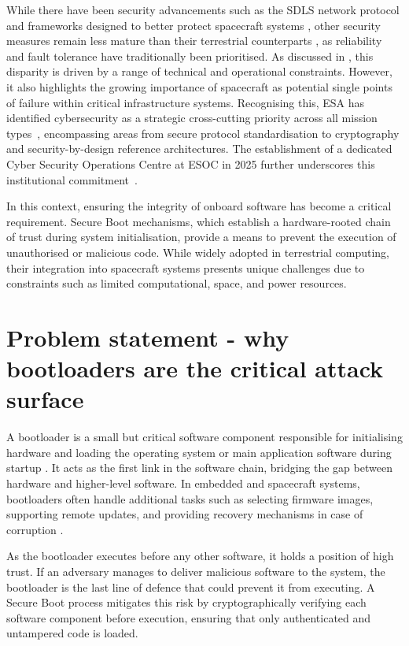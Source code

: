 While there have been security advancements such as the SDLS network protocol \cite{SDLS_Protocol_2010} and frameworks designed to better protect spacecraft systems \cite{Moutafis_2025, ESA_SPACE_SHIELD_2023}, other security measures remain less mature than their terrestrial counterparts \cite{space_odyssey_2023, space_vacuum_cyber, call_to_action}, as reliability and fault tolerance have traditionally been prioritised. As discussed in \cite{space_vacuum_cyber}, this disparity is driven by a range of technical and operational constraints. However, it also highlights the growing importance of spacecraft as potential single points of failure within critical infrastructure systems. Recognising this, ESA has identified cybersecurity as a strategic cross-cutting priority across all mission types~\cite{ESA_Tech_Strategy_2023, ESA_Cyber_TEC}, encompassing areas from secure protocol standardisation to cryptography and security-by-design reference architectures. The establishment of a dedicated Cyber Security Operations Centre at ESOC in 2025 further underscores this institutional commitment~\cite{ESA_CSOC_2025}.

In this context, ensuring the integrity of onboard software has become a critical requirement. Secure Boot mechanisms, which establish a hardware-rooted chain of trust during system initialisation, provide a means to prevent the execution of unauthorised or malicious code. While widely adopted in terrestrial computing, their integration into spacecraft systems presents unique challenges due to constraints such as limited computational, space, and power resources.

\section{Problem statement - why bootloaders are the critical attack surface}
\label{section:intro-statement}

A bootloader is a small but critical software component responsible for initialising hardware and loading the operating system or main application software during startup \cite{nasa_2024, obc_cubesats_2024}. It acts as the first link in the software chain, bridging the gap between hardware and higher-level software. In embedded and spacecraft systems, bootloaders often handle additional tasks such as selecting firmware images, supporting remote updates, and providing recovery mechanisms in case of corruption \cite{cubesat_fsw_design, beningo_2015, SAVOIR}.

As the bootloader executes before any other software, it holds a position of high trust. If an adversary manages to deliver malicious software to the system, the bootloader is the last line of defence that could prevent it from executing. A Secure Boot process mitigates this risk by cryptographically verifying each software component before execution, ensuring that only authenticated and untampered code is loaded. 

